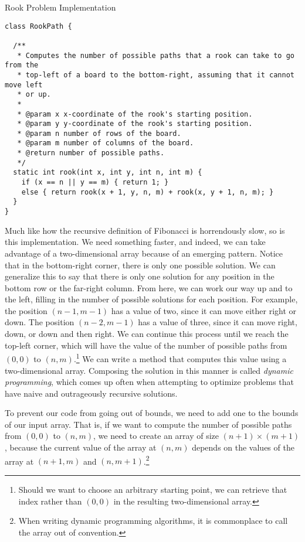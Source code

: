 \begin{cl}{Rook Problem Implementation}
\begin{lstlisting}[language=MyJava]
class RookPath {

  /**
   * Computes the number of possible paths that a rook can take to go from the
   * top-left of a board to the bottom-right, assuming that it cannot move left
   * or up.
   *
   * @param x x-coordinate of the rook's starting position.
   * @param y y-coordinate of the rook's starting position.
   * @param n number of rows of the board.
   * @param m number of columns of the board.
   * @return number of possible paths.
   */
  static int rook(int x, int y, int n, int m) {
    if (x == n || y == m) { return 1; }
    else { return rook(x + 1, y, n, m) + rook(x, y + 1, n, m); }
  }
}
\end{lstlisting}
\end{cl}

Much like how the recursive definition of Fibonacci is horrendously slow, so is this implementation. We need something faster, and indeed, we can take advantage of a two-dimensional array because of an emerging pattern. Notice that in the bottom-right corner, there is only one possible solution. We can generalize this to say that there is only one solution for any position in the bottom row or the far-right column. From here, we can work our way up and to the left, filling in the number of possible solutions for each position. For example, the position $(n - 1, m - 1)$ has a value of two, since it can move either right or down. The position $(n - 2, m - 1)$ has a value of three, since it can move right, down, or down and then right. We can continue this process until we reach the top-left corner, which will have the value of the number of possible paths from $(0, 0)$ to $(n, m)$.\footnote{Should we want to choose an arbitrary starting point, we can retrieve that index rather than $(0, 0)$ in the resulting two-dimensional array.} We can write a method that computes this value using a two-dimensional array. Composing the solution in this manner is called \textit{dynamic programming}, which comes up often when attempting to optimize problems that have naive and outrageously recursive solutions.

To prevent our code from going out of bounds, we need to add one to the bounds of our input array. That is, if we want to compute the number of possible paths from $(0, 0)$ to $(n, m)$, we need to create an array of size $(n + 1) \times (m + 1)$, because the current value of the array at $(n, m)$ depends on the values of the array at $(n + 1, m)$ and $(n, m + 1)$.\footnote{When writing dynamic programming algorithms, it is commonplace to call the array  out of convention.} 

